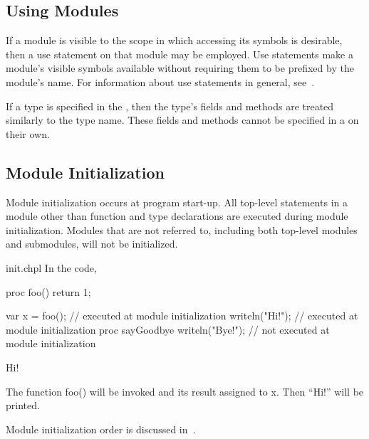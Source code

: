 \subsection{Using Modules}
\label{Using_Modules}

If a module is visible to the scope in which accessing its symbols is desirable,
then a use statement on that module may be employed.  Use statements
make a module's visible symbols available without requiring them to be
prefixed by the module's name.  For information about use statements in general,
see~.

If a type is specified in the , then the type's fields
and methods are treated similarly to the type name.  These fields and methods
cannot be specified in a  on their own.



\subsection{Module Initialization}
\label{Module_Initialization}

Module initialization occurs at program start-up.  All top-level
statements in a module other than function and type declarations are
executed during module initialization. Modules that are not referred to,
including both top-level modules and submodules, will not be initialized.

\begin{chapelexample}{init.chpl}
In the code,
\begin{chapelpre}
proc foo() {
    return 1;
}
\end{chapelpre}
\begin{chapel}
var x = foo();       // executed at module initialization
writeln("Hi!");      // executed at module initialization
proc sayGoodbye {
  writeln("Bye!");   // not executed at module initialization
}
\end{chapel}
\begin{chapeloutput}
Hi!
\end{chapeloutput}
The function foo() will be invoked and its result assigned to x.  Then
``Hi!'' will be printed.
\end{chapelexample}

Module initialization order is discussed
in~.


